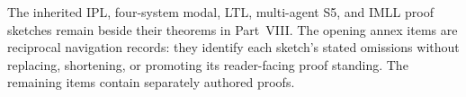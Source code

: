 \label{annex:p08}
The inherited IPL, four-system modal, LTL, multi-agent S5, and IMLL proof
sketches remain beside their theorems in Part~VIII.  The opening annex items are reciprocal
navigation records: they identify each sketch's stated omissions without
replacing, shortening, or promoting its reader-facing proof standing.  The
remaining items contain separately authored proofs.



